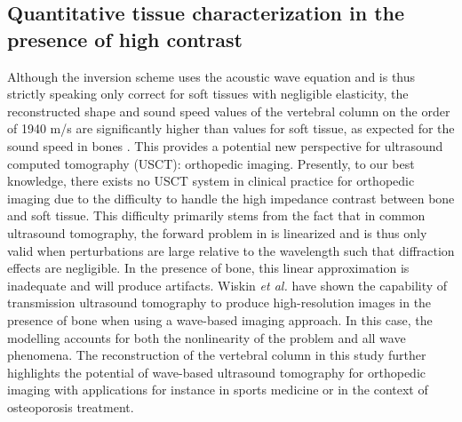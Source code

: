 \documentclass[12pt]{iopart}
\begin{document}
\subsection{Quantitative tissue characterization in the presence of high contrast}
Although the inversion scheme uses the acoustic wave equation and is thus strictly speaking only correct for soft tissues with negligible elasticity, the reconstructed shape and sound speed values of the vertebral column on the order of 1940 m/s are significantly higher than values for soft tissue, as expected for the sound speed in bones \cite{ITIS_database}. This provides a potential new perspective for ultrasound computed tomography (USCT): orthopedic imaging. Presently, to our best knowledge, there exists no USCT system in clinical practice for orthopedic imaging due to the difficulty to handle the high impedance contrast between bone and soft tissue. This difficulty primarily stems from the fact that in common ultrasound tomography, the forward problem in  is linearized and is thus only valid when perturbations are large relative to the wavelength such that diffraction effects are negligible. In the presence of bone, this linear approximation is inadequate and will produce artifacts. Wiskin \textit{et al.} \cite{Wiskin_boneUS_2020} have shown the capability of transmission ultrasound tomography to produce high-resolution images in the presence of bone when using a wave-based imaging approach. In this case, the modelling accounts for both the nonlinearity of the problem and all wave phenomena. The reconstruction of the vertebral column in this study further highlights the potential of wave-based ultrasound tomography for orthopedic imaging with applications for instance in sports medicine or in the context of osteoporosis treatment.  

\end{document}
